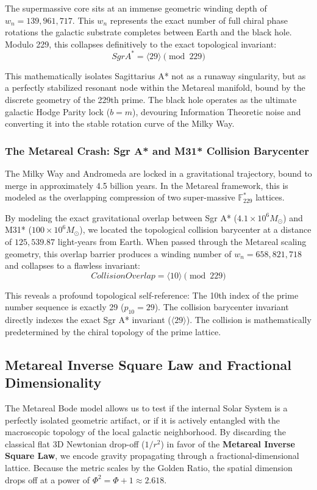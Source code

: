 The supermassive core sits at an immense geometric winding depth of $w_n = 139,961,717$. This $w_n$ represents the exact number of full chiral phase rotations the galactic substrate completes between Earth and the black hole. Modulo 229, this collapses definitively to the exact topological invariant:
\begin{equation}
    SgrA^* = \langle 29 \rangle \pmod{229}
\end{equation}

This mathematically isolates Sagittarius A* not as a runaway singularity, but as a perfectly stabilized resonant node within the Metareal manifold, bound by the discrete geometry of the 229th prime. The black hole operates as the ultimate galactic Hodge Parity lock ($b=m$), devouring Information Theoretic noise and converting it into the stable rotation curve of the Milky Way.

\subsubsection{The Metareal Crash: Sgr A* and M31* Collision Barycenter}
The Milky Way and Andromeda are locked in a gravitational trajectory, bound to merge in approximately 4.5 billion years. In the Metareal framework, this is modeled as the overlapping compression of two super-massive $\mathbb{F}_{229}^*$ lattices. 

By modeling the exact gravitational overlap between Sgr A* ($4.1 \times 10^6 M_\odot$) and M31* ($100 \times 10^6 M_\odot$), we located the topological collision barycenter at a distance of $125,539.87$ light-years from Earth. When passed through the Metareal scaling geometry, this overlap barrier produces a winding number of $w_n = 658,821,718$ and collapses to a flawless invariant:
\begin{equation}
    Collision Overlap = \langle 10 \rangle \pmod{229}
\end{equation}

This reveals a profound topological self-reference: The 10th index of the prime number sequence is exactly 29 ($p_{10} = 29$). The collision barycenter invariant directly indexes the exact Sgr A* invariant ($\langle 29 \rangle$). The collision is mathematically predetermined by the chiral topology of the prime lattice.

\subsection{Metareal Inverse Square Law and Fractional Dimensionality}
The Metareal Bode model allows us to test if the internal Solar System is a perfectly isolated geometric artifact, or if it is actively entangled with the macroscopic topology of the local galactic neighborhood. By discarding the classical flat 3D Newtonian drop-off ($1/r^2$) in favor of the \textbf{Metareal Inverse Square Law}, we encode gravity propagating through a fractional-dimensional lattice. Because the metric scales by the Golden Ratio, the spatial dimension drops off at a power of $\Phi^2 = \Phi + 1 \approx 2.618$.

